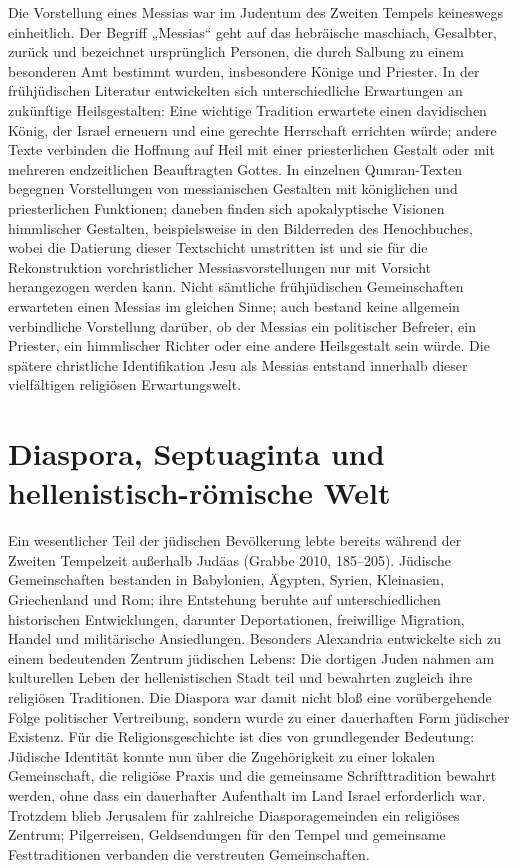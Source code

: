 \documentclass[fontsize=12pt]{mybib}
\begin{document}
Die Vorstellung eines Messias war im Judentum des Zweiten Tempels keineswegs einheitlich. Der Begriff „Messias“ geht auf das hebräische maschiach, Gesalbter, zurück und bezeichnet ursprünglich Personen, die durch Salbung zu einem besonderen Amt bestimmt wurden, insbesondere Könige und Priester. In der frühjüdischen Literatur entwickelten sich unterschiedliche Erwartungen an zukünftige Heilsgestalten: Eine wichtige Tradition erwartete einen davidischen König, der Israel erneuern und eine gerechte Herrschaft errichten würde; andere Texte verbinden die Hoffnung auf Heil mit einer priesterlichen Gestalt oder mit mehreren endzeitlichen Beauftragten Gottes. In einzelnen Qumran-Texten begegnen Vorstellungen von messianischen Gestalten mit königlichen und priesterlichen Funktionen; daneben finden sich apokalyptische Visionen himmlischer Gestalten, beispielsweise in den Bilderreden des Henochbuches, wobei die Datierung dieser Textschicht umstritten ist und sie für die Rekonstruktion vorchristlicher Messiasvorstellungen nur mit Vorsicht herangezogen werden kann. Nicht sämtliche frühjüdischen Gemeinschaften erwarteten einen Messias im gleichen Sinne; auch bestand keine allgemein verbindliche Vorstellung darüber, ob der Messias ein politischer Befreier, ein Priester, ein himmlischer Richter oder eine andere Heilsgestalt sein würde. Die spätere christliche Identifikation Jesu als Messias entstand innerhalb dieser vielfältigen religiösen Erwartungswelt.

\section{Diaspora, Septuaginta und hellenistisch-römische Welt}

Ein wesentlicher Teil der jüdischen Bevölkerung lebte bereits während der Zweiten Tempelzeit außerhalb Judäas (Grabbe 2010, 185–205). Jüdische Gemeinschaften bestanden in Babylonien, Ägypten, Syrien, Kleinasien, Griechenland und Rom; ihre Entstehung beruhte auf unterschiedlichen historischen Entwicklungen, darunter Deportationen, freiwillige Migration, Handel und militärische Ansiedlungen. Besonders Alexandria entwickelte sich zu einem bedeutenden Zentrum jüdischen Lebens: Die dortigen Juden nahmen am kulturellen Leben der hellenistischen Stadt teil und bewahrten zugleich ihre religiösen Traditionen. Die Diaspora war damit nicht bloß eine vorübergehende Folge politischer Vertreibung, sondern wurde zu einer dauerhaften Form jüdischer Existenz. Für die Religionsgeschichte ist dies von grundlegender Bedeutung: Jüdische Identität konnte nun über die Zugehörigkeit zu einer lokalen Gemeinschaft, die religiöse Praxis und die gemeinsame Schrifttradition bewahrt werden, ohne dass ein dauerhafter Aufenthalt im Land Israel erforderlich war. Trotzdem blieb Jerusalem für zahlreiche Diasporagemeinden ein religiöses Zentrum; Pilgerreisen, Geldsendungen für den Tempel und gemeinsame Festtraditionen verbanden die verstreuten Gemeinschaften.
\end{document}
